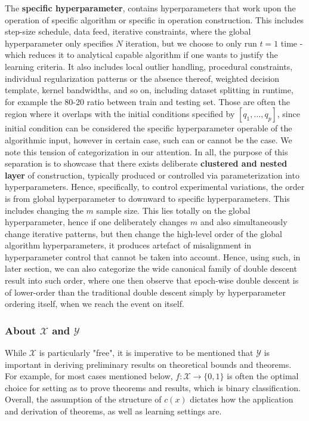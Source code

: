 The \textbf{specific hyperparameter}, contains hyperparameters that work upon the operation of specific algorithm or specific in operation construction. This includes step-size schedule, data feed, iterative constraints, where the global hyperparameter only specifies $N$ iteration, but we choose to only run $t=1$ time - which reduces it to analytical capable algorithm if one wants to justify the learning criteria. It also includes local outlier handling, procedural constraints, individual regularization patterns or the absence thereof, weighted decision template, kernel bandwidths, and so on, including dataset splitting in runtime, for example the 80-20 ratio between train and testing set. Those are often the region where it overlaps with the initial conditions specified by $[q_{1},\dots,q_{p}]$, since initial condition can be considered the specific hyperparameter operable of the algorithmic input, however in certain case, such can or cannot be the case. We note this tension of categorization in our attention. In all, the purpose of this separation is to showcase that there exists deliberate \textbf{clustered and nested layer} of construction, typically produced or controlled via parameterization into hyperparameters. Hence, specifically, to control experimental variations, the order is from global hyperparameter to downward to specific hyperparameters. This includes changing the $m$ sample size. This lies totally on the global hyperparameter, hence if one deliberately changes $m$ and also simultaneously change iterative patterns, but then change the high-level order of the global algorithm hyperparameters, it produces artefact of misalignment in hyperparameter control that cannot be taken into account. Hence, using such, in later section, we can also categorize the wide canonical family of double descent result into such order, where one then observe that epoch-wise double descent is of lower-order than the traditional double descent simply by hyperparameter ordering itself, when we reach the event on itself. 

\subsubsection{About $\mathcal{X}$ and $\mathcal{Y}$}
While $\mathcal{X}$ is particularly "free", it is imperative to be mentioned that $\mathcal{Y}$ is important in deriving preliminary results on theoretical bounds and theorems. For example, for most cases mentioned below, $f: \mathcal{X}\to \{0,1\}$ is often the optimal choice for setting as to prove theorems and results, which is binary classification. Overall, the assumption of the structure of $c(x)$ dictates how the application and derivation of theorems, as well as learning settings are. 

